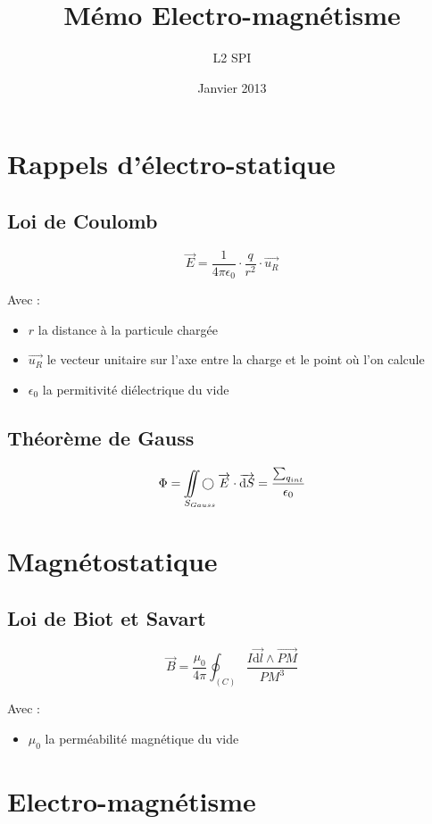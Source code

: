 \documentclass[a4paper, 11pt]{article}
\title{Mémo Electro-magnétisme}
\author{L2 SPI}
\date{Janvier 2013}
\newcommand{\ve}{\overrightarrow}
\newcommand{\fint}{%
        \setbox0=\hbox{$\displaystyle \int\!\!\!\!\!\int$}
        \setbox1=\hbox to \wd0{\hfill$\bigcirc$\hfill}
        \setbox0=\hbox to \wd0{\copy0\hss\copy1}
        \mathop{\copy0}
    }
\begin{document}
	\maketitle

    \section{Rappels d'électro-statique}

    \subsection{Loi de Coulomb}

    $$\ve{E} = \frac{1}{4\pi\epsilon_0}\cdot\frac{q}{r^2}\cdot\ve{u_R}$$

    Avec :
    \begin{itemize}
        \item $r$ la distance à la particule chargée
        \item $\ve{u_R}$ le vecteur unitaire sur l'axe entre la charge et le point où l'on calcule
        \item $\epsilon_0$ la permitivité diélectrique du vide
    \end{itemize}

    \subsection{Théorème de Gauss}

    $$\Phi = \fint_{S_{Gauss}}\ve{E}\cdot\ve{\mathrm{d}S} = \frac{\sum_{q_{int}}}{\epsilon_0}$$

    \section{Magnétostatique}

    \subsection{Loi de Biot et Savart}

    $$\ve{B} = \frac{\mu_0}{4\pi}\oint_{(C)}\frac{I\ve{\mathrm{d}l}\wedge\ve{PM}}{PM^3}$$

    Avec :
    \begin{itemize}
    \item $\mu_0$ la perméabilité magnétique du vide
    \end{itemize}

    \section{Electro-magnétisme}
\end{document}
